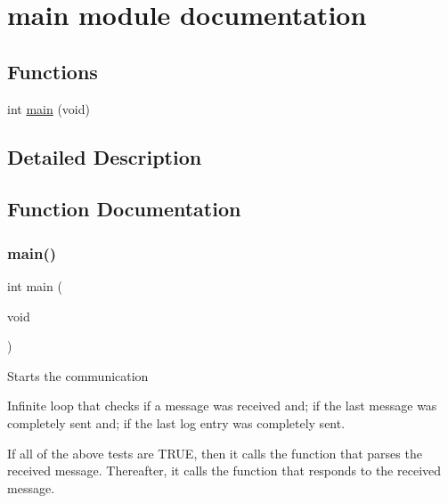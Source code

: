 \hypertarget{group__main__module}{}\section{main module documentation}
\label{group__main__module}
\subsection*{Functions}
\begin{DoxyCompactItemize}
\item 
int \hyperlink{group__main__module_ga840291bc02cba5474a4cb46a9b9566fe}{main} (void)
\end{DoxyCompactItemize}


\subsection{Detailed Description}


\subsection{Function Documentation}
\mbox{\label{group__main__module_ga840291bc02cba5474a4cb46a9b9566fe}} 
\subsubsection{\texorpdfstring{main()}{main()}}
{\footnotesize\ttfamily int main (\begin{DoxyParamCaption}\item[{void}]{ }\end{DoxyParamCaption})}

Starts the communication

Infinite loop that checks if a message was received and; if the last message was completely sent and; if the last log entry was completely sent.

If all of the above tests are T\+R\+UE, then it calls the function that parses the received message. Thereafter, it calls the function that responds to the received message.